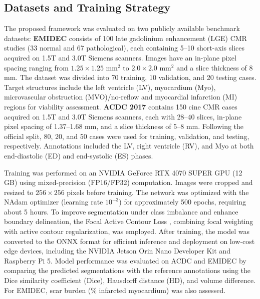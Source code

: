 \documentclass[runningheads]{llncs}
\begin{document}
\subsection{Datasets and Training Strategy}
The proposed framework was evaluated on two publicly available benchmark datasets: \textbf{EMIDEC} \cite{emidec} consists of 100 late gadolinium enhancement (LGE) CMR studies (33 normal and 67 pathological), each containing 5--10 short-axis slices acquired on 1.5T and 3.0T Siemens scanners. Images have an in-plane pixel spacing ranging from $1.25 \times 1.25$ mm$^2$ to $2.0 \times 2.0$ mm$^2$ and a slice thickness of 8 mm. The dataset was divided into 70 training, 10 validation, and 20 testing cases. Target structures include the left ventricle (LV), myocardium (Myo), microvascular obstruction (MVO)/no-reflow and myocardial infarction (MI) regions for viability assessment. \textbf{ACDC 2017} \cite{acdc} contains 150 cine CMR cases acquired on 1.5T and 3.0T Siemens scanners, each with 28--40 slices, in-plane pixel spacing of 1.37--1.68 mm, and a slice thickness of 5--8 mm. Following the official split, 80, 20, and 50 cases were used for training, validation, and testing, respectively. Annotations included the LV, right ventricle (RV), and Myo at both end-diastolic (ED) and end-systolic (ES) phases.

Training was performed on an NVIDIA GeForce RTX 4070 SUPER GPU (12 GB) using mixed-precision (FP16/FP32) computation. Images were cropped and resized to $256 \times 256$ pixels before training. The network was optimized with the NAdam optimizer \cite{nadam} (learning rate $10^{-3}$) for approximately 500 epochs, requiring about 5 hours. To improve segmentation under class imbalance and enhance boundary delineation, the Focal Active Contour Loss \cite{focal_active_loss}, combining focal weighting with active contour regularization, was employed. After training, the model was converted to the ONNX format for efficient inference and deployment on low-cost edge devices, including the NVIDIA Jetson Orin Nano Developer Kit and Raspberry Pi 5. Model performance was evaluated on ACDC and EMIDEC by comparing the predicted segmentations with the reference annotations using the Dice similarity coefficient (Dice), Hausdorff distance (HD), and volume difference. For EMIDEC, scar burden (\% infarcted myocardium) was also assessed.
\end{document}
